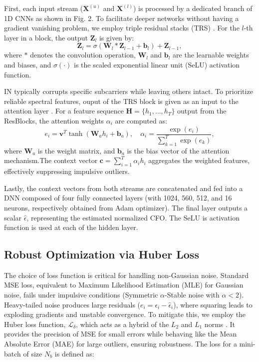 \documentclass[10pt, journal]{IEEEtran}
\begin{document}
First, each input stream ($\mathbf{X}^{(u)}$ and $\mathbf{X}^{(l)}$) is processed by a dedicated branch of 1D CNNs as shown in Fig. 2. To facilitate deeper networks without having a gradient vanishing problem, we employ triple residual stacks (TRS) \cite{he2016deep}. For the $l$-th layer in a block, the output $\mathbf{Z}_{l}$ is given by:
\begin{equation}
\mathbf{Z}_{l} = \sigma\left(\mathbf{W}_l * \mathbf{Z}_{l-1} + \mathbf{b}_l\right) + \mathbf{Z}_{l-1},
\end{equation}
where $*$ denotes the convolution operation, $\mathbf{W}_l$ and $\mathbf{b}_l$ are the learnable weights and biases, and $\sigma(\cdot)$ is the scaled exponential linear unit (SeLU) activation function.

IN typically corrupts specific subcarriers while leaving others intact. To prioritize reliable spectral features, ouput of the TRS block is given as an input to the attention layer \cite{bahdanau2014neural}. For a feature sequence $\mathbf{H} = \{h_1, \dots, h_T\}$ output from the ResBlocks, the attention weights $\alpha_i$ are computed as:
\begin{equation}
e_i = \mathbf{v}^T \tanh(\mathbf{W}_a h_i + \mathbf{b}_a), \quad \alpha_i = \frac{\exp(e_i)}{\sum_{k=1}^{T} \exp(e_k)},
\end{equation}
where $\mathbf{W}_a$ is the weight matrix, and $\mathbf{b}_a$ is the bias vector of the attention mechanism.The context vector $\mathbf{c} = \sum_{i=1}^{T} \alpha_i h_i$ aggregates the weighted features, effectively suppressing impulsive outliers.

Lastly, the context vectors from both streams are concatenated and fed into a DNN composed of four fully connected layers (with 1024, 560, 512, and 16 neurons, respectively obtained from Adam optimizer). The final layer outputs a scalar $\hat{\epsilon}$, representing the estimated normalized CFO. The SeLU is activation function is used at each of the hidden layer.

\subsection{Robust Optimization via Huber Loss}
The choice of loss function is critical for handling non-Gaussian noise. Standard MSE loss, equivalent to Maximum Likelihood Estimation (MLE) for Gaussian noise, fails under impulsive conditions (Symmetric $\alpha$-Stable noise with $\alpha < 2$). Heavy-tailed noise produces large residuals ($e_i = \epsilon_i - \hat{\epsilon}_i$), where squaring leads to exploding gradients and unstable convergence. To mitigate this, we employ the Huber loss function, $\mathcal{L}_{\delta}$, which acts as a hybrid of the $L_2$ and $L_1$ norms \cite{huber1964robust}. It provides the precision of MSE for small errors while behaving like the Mean Absolute Error (MAE) for large outliers, ensuring robustness. The loss for a mini-batch of size $N_b$ is defined as:
\end{document}
